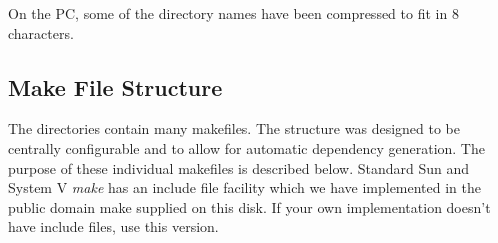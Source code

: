 \medskip
On the PC, some of the  directory names have been
compressed to fit in 8 characters.

\subsection{Make File Structure}
  
\label{Make}

The  directories contain many makefiles.  The structure
was designed to be centrally configurable and to allow for automatic
dependency generation.  The purpose
of these individual makefiles is described below.  Standard
Sun and System V {\em make} has an include file facility which we have implemented
in the public domain make supplied on this disk.  If your own implementation
doesn't have include files, use this version.

